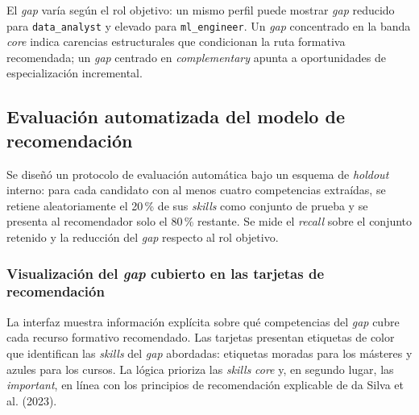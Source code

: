 El \textit{gap} varía según el rol objetivo: un mismo perfil puede mostrar \textit{gap} reducido para \texttt{data\_analyst} y elevado para \texttt{ml\_engineer}. Un \textit{gap} concentrado en la banda \textit{core} indica carencias estructurales que condicionan la ruta formativa recomendada; un \textit{gap} centrado en \textit{complementary} apunta a oportunidades de especialización incremental.

\subsection{Evaluación automatizada del modelo de recomendación}
\label{subsec:evaluacion_modelo}
Se diseñó un protocolo de evaluación automática bajo un esquema de \textit{holdout} interno: para cada candidato con al menos cuatro competencias extraídas, se retiene aleatoriamente el 20\,\% de sus \textit{skills} como conjunto de prueba y se presenta al recomendador solo el 80\,\% restante. Se mide el \textit{recall} sobre el conjunto retenido y la reducción del \textit{gap} respecto al rol objetivo.

\subsubsection{Visualización del \textit{gap} cubierto en las tarjetas de recomendación}
\label{subsubsec:visualizacion_gap}
La interfaz muestra información explícita sobre qué competencias del \textit{gap} cubre cada recurso formativo recomendado. Las tarjetas presentan etiquetas de color que identifican las \textit{skills} del \textit{gap} abordadas: etiquetas moradas para los másteres y azules para los cursos. La lógica prioriza las \textit{skills} \textit{core} y, en segundo lugar, las \textit{important}, en línea con los principios de recomendación explicable de da Silva et al. (2023).
